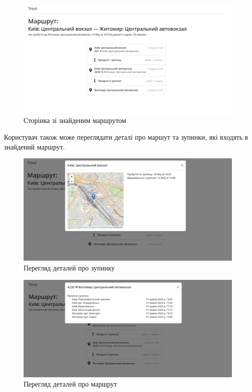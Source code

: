 \begin{figure}[!htp]
	\centering
	\includegraphics[scale=0.4]{content/chapters/4-results/assets/img/example1_result.png}
	\caption{Сторінка зі знайденим маршрутом}
	\label{fig:route_page}
\end{figure}


Користувач також може переглядати деталі про маршут та зупинки, які входять в знайдений маршрут.

\begin{figure}[!htp]
	\centering
	\includegraphics[scale=0.4]{content/chapters/4-results/assets/img/example_station.png}
	\caption{Перегляд деталей про зупинку}
	\label{fig:stop_details_page}
\end{figure}

\begin{figure}[!htp]
	\centering
	\includegraphics[scale=0.4]{content/chapters/4-results/assets/img/example_stops.png}
	\caption{Перегляд деталей про маршрут}
	\label{fig:route_details_page}
\end{figure}
